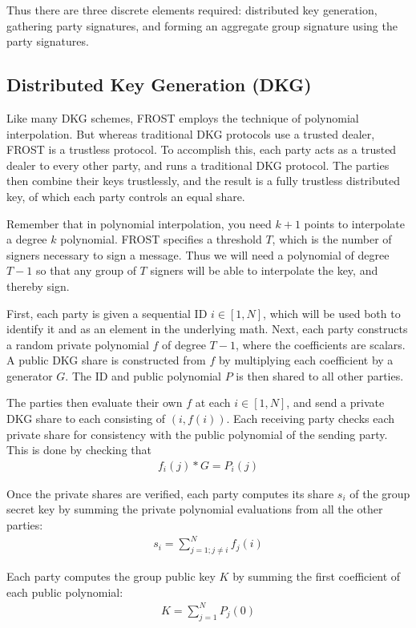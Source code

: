 \documentclass{article}
\begin{document}
Thus there are three discrete elements required: distributed key generation, gathering party signatures, and forming an aggregate group signature using the party signatures.

\subsection{
  Distributed Key Generation (DKG)
}

Like many DKG schemes, FROST employs the technique of polynomial interpolation.  But whereas traditional DKG protocols use a trusted dealer, FROST is a trustless protocol.  To accomplish this, each party acts as a trusted dealer to every other party, and runs a traditional DKG protocol.  The parties then combine their keys trustlessly, and the result is a fully trustless distributed key, of which each party controls an equal share.

Remember that in polynomial interpolation, you need $k+1$ points to interpolate a degree $k$ polynomial.  FROST specifies a threshold $T$, which is the number of signers necessary to sign a message.  Thus we will need a polynomial of degree $T-1$ so that any group of $T$ signers will be able to interpolate the key, and thereby sign.

First, each party is given a sequential ID $i \in [1, N]$, which will be used both to identify it and as an element in the underlying math.  Next, each party constructs a random private polynomial $f$ of degree $T-1$, where the coefficients are scalars.  A public DKG share is constructed from $f$ by multiplying each coefficient by a generator $G$.  The ID and public polynomial $P$ is then shared to all other parties.

The parties then evaluate their own $f$ at each $i \in [1,N]$, and send a private DKG share to each consisting of $(i, f(i))$.  Each receiving party checks each private share for consistency with the public polynomial of the sending party.  This is done by checking that
\begin{align}
  f_i(j) * G = P_i(j)
\end{align}

Once the private shares are verified, each party computes its share $s_i$ of the group secret key by summing the private polynomial evaluations from all the other parties:
\begin{align}
  s_i = \sum_{j=1; j \neq i}^{N} f_j(i)
\end{align}

Each party computes the group public key $K$ by summing the first coefficient of each public polynomial:
\begin{align}
  K = \sum_{j=1}^{N} P_j(0)
\end{align}
\end{document}
